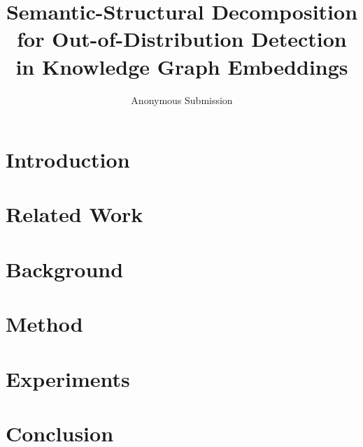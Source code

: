 \documentclass[11pt]{article}
\title{Semantic-Structural Decomposition for Out-of-Distribution Detection in Knowledge Graph Embeddings}
\author{
  Anonymous Submission
}
\begin{document}
\maketitle

\begin{abstract}

\end{abstract}

\section{Introduction}
\label{sec:intro}


\section{Related Work}
\label{sec:related}


\section{Background}
\label{sec:background}


\section{Method}
\label{sec:method}


\section{Experiments}
\label{sec:experiments}


\section{Conclusion}
\label{sec:conclusion}

\end{document}
